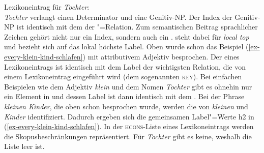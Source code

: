 \eas
\label{le-Tochter}%
Lexikoneintrag für \emph{Tochter}:\\
\zs
\emph{Tochter} verlangt einen Determinator und eine Genitiv-NP. Der Index der Genitiv-NP ist
identisch mit dem \argone der "=Relation. Zum semantischen Beitrag sprachlicher
Zeichen gehört nicht nur ein Index, sondern auch ein \ltopm. \ltop{} steht dabei für \emph{local top}
und bezieht sich auf das lokal höchste Label. Oben wurde schon das Beispiel (\ref{ex-every-klein-kind-schlafen}) mit attributivem
Adjektiv besprochen. Der \ltopw eines Lexikoneintrags ist identisch mit dem Label der wichtigsten Relation, die von einem
Lexikoneintrag eingeführt wird (dem sogenannten \textsc{key}). Bei einfachen Beispielen wie dem
Adjektiv \emph{klein} und dem Nomen \emph{Tochter} gibt es ohnehin nur ein Element in \rels und
dessen Label ist dann identisch mit dem \ltop. Bei der Phrase \emph{kleinen Kinder}\label{page-kleinen-Kinder}, die oben schon
besprochen wurde, werden die \ltopwe von \emph{kleinen} und \emph{Kinder} identifiziert. Dadurch
ergeben sich die gemeinsamen Label"=Werte h2 in (\ref{ex-every-klein-kind-schlafen}). In der
\textsc{hcons}-Liste eines Lexikoneintrags werden die Skopusbeschränkungen repräsentiert. Für
\emph{Tochter} gibt es keine, weshalb die Liste leer ist.

